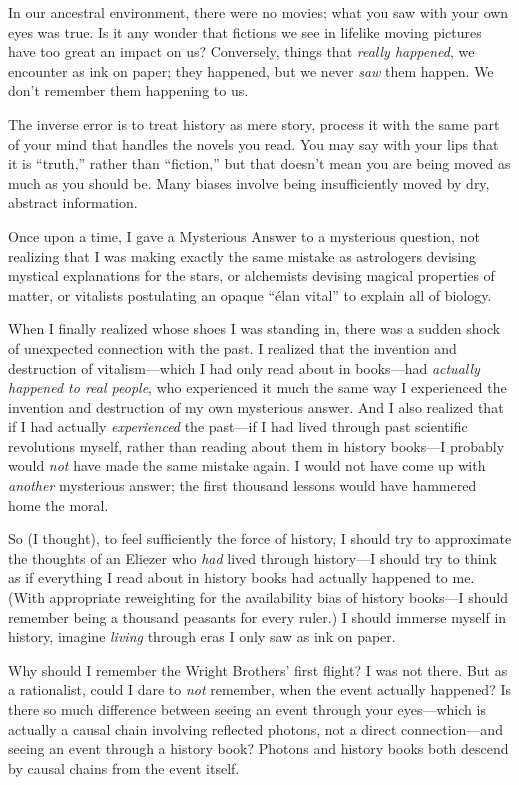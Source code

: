 {
 In our ancestral environment, there were no movies; what you saw
with your own eyes was true. Is it any wonder that fictions we see in
lifelike moving pictures have too great an impact on us? Conversely,
things that \textit{really happened}, we encounter as ink on paper;
they happened, but we never \textit{saw} them happen. We
don't remember them happening to us.}

{
 The inverse error is to treat history as mere story, process it
with the same part of your mind that handles the novels you read. You
may say with your lips that it is
``truth,'' rather than
``fiction,'' but that
doesn't mean you are being moved as much as you should
be. Many biases involve being insufficiently moved by dry, abstract
information.}

{
 Once upon a time, I gave a Mysterious Answer to a mysterious
question, not realizing that I was making exactly the same mistake as
astrologers devising mystical explanations for the stars, or alchemists
devising magical properties of matter, or vitalists postulating an
opaque ``élan vital'' to explain all
of biology.}

{
 When I finally realized whose shoes I was standing in, there was a
sudden shock of unexpected connection with the past. I realized that
the invention and destruction of vitalism---which I had only read about
in books---had \textit{actually happened to real people}, who
experienced it much the same way I experienced the invention and
destruction of my own mysterious answer. And I also realized that if I
had actually \textit{experienced} the past---if I had lived through
past scientific revolutions myself, rather than reading about them in
history books---I probably would \textit{not} have made the same
mistake again. I would not have come up with \textit{another}
mysterious answer; the first thousand lessons would have hammered home
the moral.}

{
 So (I thought), to feel sufficiently the force of history, I
should try to approximate the thoughts of an Eliezer who \textit{had}
lived through history---I should try to think as if everything I read
about in history books had actually happened to me. (With appropriate
reweighting for the availability bias of history books---I should
remember being a thousand peasants for every ruler.) I should immerse
myself in history, imagine \textit{living} through eras I only saw as
ink on paper.}

{
 Why should I remember the Wright Brothers' first
flight? I was not there. But as a rationalist, could I dare to
\textit{not} remember, when the event actually happened? Is there so
much difference between seeing an event through your eyes---which is
actually a causal chain involving reflected photons, not a direct
connection---and seeing an event through a history book? Photons and
history books both descend by causal chains from the event itself.}

